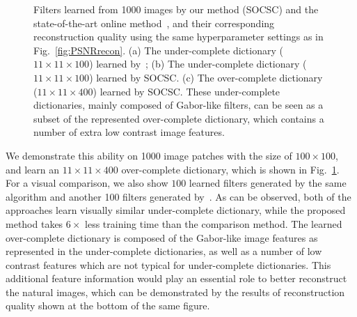 \begin{figure}[h]
\begin{minipage}{1\textwidth}
    \centering
\end{minipage}
\caption{Filters learned from 1000 images by our method (SOCSC) and the state-of-the-art online method~\cite{liu-2018-first}, and their corresponding reconstruction quality using the same hyperparameter settings as in Fig.~\ref{fig:PSNRrecon}. (a) The under-complete dictionary ($11 \times 11 \times 100$) learned by~\cite{liu-2018-first}; (b) The under-complete dictionary ($11 \times 11 \times 100$) learned by SOCSC. (c) The over-complete dictionary ($11 \times 11 \times 400$) learned by SOCSC. These under-complete dictionaries, mainly composed of Gabor-like filters, can be seen as a subset of the represented over-complete dictionary, which contains a number of extra low contrast image features.}
\label{fig:overCompleteDic}
\end{figure}

We demonstrate this ability on 1000 image patches with the size of
$100 \times 100$, and learn an $11 \times 11 \times 400$ over-complete
dictionary, which is shown in Fig.~\ref{fig:overCompleteDic}. For a
visual comparison, we also show $100$ learned filters generated by the
same algorithm and another 100 filters generated
by~\cite{liu-2018-first}. As can be observed, both of the approaches
learn visually similar under-complete dictionary, while the proposed
method takes $6 \times$ less training time than the comparison
method. The learned over-complete dictionary is composed of
the Gabor-like image features as represented in the under-complete
dictionaries, as well as a number of low contrast features which are
not typical for under-complete dictionaries. This additional
feature information would play an essential role to better reconstruct
the natural images, which can be demonstrated by the results of
reconstruction quality shown at the bottom of the same figure.

